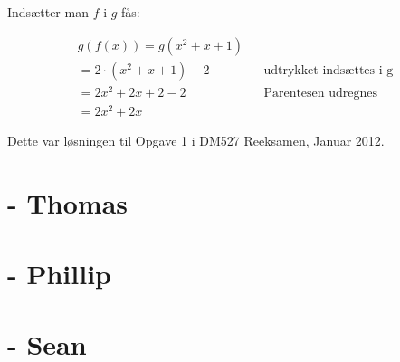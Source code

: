 \documentclass{article}
\begin{document}
Indsætter man $f$ i $g$ fås:
\begin{center}
\begin{align*}
g(f(x)) = g(x^2 + x + 1) \\
= 2 \cdot (x^2 + x + 1) - 2 && \text{udtrykket indsættes i g} \\
= 2x^2 + 2x + 2 - 2 && \text{Parentesen udregnes} \\
= 2x^2 + 2x
\end{align*}
\end{center}

Dette var løsningen til Opgave 1 i DM527 Reeksamen, Januar 2012.

\section{- Thomas}

\section{- Phillip}

\section{- Sean}
\end{document}

